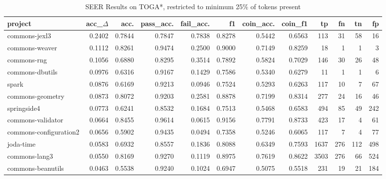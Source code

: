 \begin{table*}
\centering
\caption{SEER Results on TOGA*, restricted to minimum 25\% of tokens present}
\label{tab:toga_results_25}
\begin{tabular}{lrrrrrrrrrrr}
\toprule
                project &  acc\_$\Delta$ &    acc. &  pass\_acc. &  fail\_acc. &      f1 &  coin\_acc. &  coin\_f1 &     tp &    fn &   tn &    fp \\
\midrule
          commons-jexl3 &      0.2402 &  0.7844 &     0.7847 &     0.7838 &  0.8278 &     0.5442 &   0.6563 &    113 &    31 &   58 &    16 \\
         commons-weaver &      0.1112 &  0.8261 &     0.9474 &     0.2500 &  0.9000 &     0.7149 &   0.8259 &     18 &     1 &    1 &     3 \\
            commons-rng &      0.1056 &  0.6880 &     0.8295 &     0.3514 &  0.7892 &     0.5824 &   0.7029 &    146 &    30 &   26 &    48 \\
        commons-dbutils &      0.0976 &  0.6316 &     0.9167 &     0.1429 &  0.7586 &     0.5340 &   0.6279 &     11 &     1 &    1 &     6 \\
                  spark &      0.0876 &  0.6169 &     0.9213 &     0.0946 &  0.7524 &     0.5293 &   0.6263 &    117 &    10 &    7 &    67 \\
       commons-geometry &      0.0873 &  0.8072 &     0.9203 &     0.2581 &  0.8878 &     0.7199 &   0.8314 &    277 &    24 &   16 &    46 \\
            springside4 &      0.0773 &  0.6241 &     0.8532 &     0.1684 &  0.7513 &     0.5468 &   0.6583 &    494 &    85 &   49 &   242 \\
      commons-validator &      0.0664 &  0.8455 &     0.9614 &     0.0615 &  0.9156 &     0.7791 &   0.8733 &    423 &    17 &    4 &    61 \\
 commons-configuration2 &      0.0656 &  0.5902 &     0.9435 &     0.0494 &  0.7358 &     0.5246 &   0.6065 &    117 &     7 &    4 &    77 \\
              joda-time &      0.0583 &  0.6932 &     0.8557 &     0.1836 &  0.8088 &     0.6349 &   0.7593 &   1637 &   276 &  112 &   498 \\
          commons-lang3 &      0.0550 &  0.8169 &     0.9270 &     0.1119 &  0.8975 &     0.7619 &   0.8622 &   3503 &   276 &   66 &   524 \\
      commons-beanutils &      0.0463 &  0.5538 &     0.9240 &     0.1024 &  0.6947 &     0.5075 &   0.5518 &    231 &    19 &   21 &   184 \\

\end{tabular}
\end{table*}
